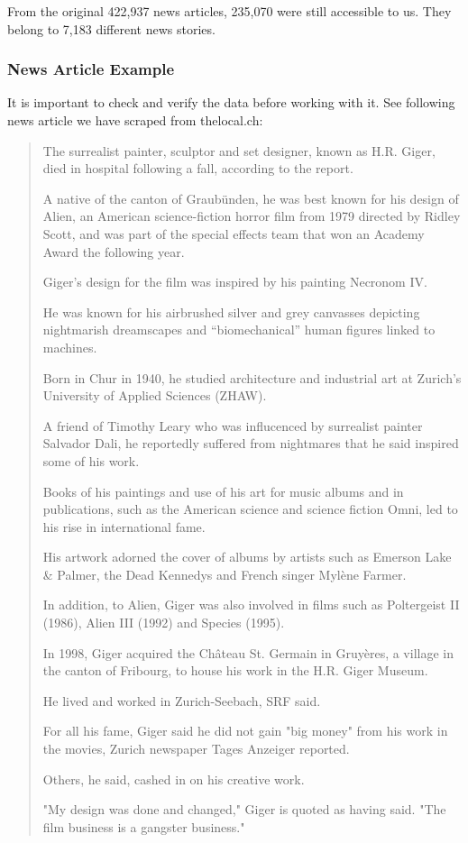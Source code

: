 From the original 422,937 news articles, 235,070 were still accessible to us.
They belong to 7,183 different news stories.

\subsubsection{News Article Example}
\label{subsubsec:4a_news_article_example}
It is important to check and verify the data before working with it.
See following news article we have scraped from thelocal.ch\cite{HRGiger}:

\begin{quote}
    The surrealist painter, sculptor and set designer, known as H.R. Giger,
    died in hospital following a fall, according to the report.

    A native of the canton of Graubünden, he was best known for his design of Alien,
    an American science-fiction horror film from 1979 directed by Ridley Scott,
    and was part of the special effects team that won an Academy Award the following year.

    Giger’s design for the film was inspired by his painting Necronom IV.

    He was known for his airbrushed silver and grey canvasses
    depicting nightmarish dreamscapes and “biomechanical” human figures linked to machines.

    Born in Chur in 1940, he studied architecture and industrial art at
    Zurich’s University of Applied Sciences (ZHAW).

    A friend of Timothy Leary who was influcenced by surrealist painter Salvador Dali,
    he reportedly suffered from nightmares that he said inspired some of his work.

    Books of his paintings and use of his art for music albums and in publications,
    such as the American science and science fiction Omni, led to his rise in international fame.

    His artwork adorned the cover of albums by artists such as Emerson Lake \& Palmer,
    the Dead Kennedys and French singer Mylène Farmer.

    In addition, to Alien, Giger was also involved in films such as Poltergeist II (1986),
    Alien III (1992) and Species (1995).

    In 1998, Giger acquired the Château St. Germain in Gruyères,
    a village in the canton of Fribourg, to house his work in the H.R. Giger Museum.

    He lived and worked in Zurich-Seebach, SRF said.

    For all his fame, Giger said he did not gain "big money" from his work in the movies,
    Zurich newspaper Tages Anzeiger reported.

    Others, he said, cashed in on his creative work.

    "My design was done and changed," Giger is quoted as having said.
    "The film business is a gangster business."
\end{quote}

